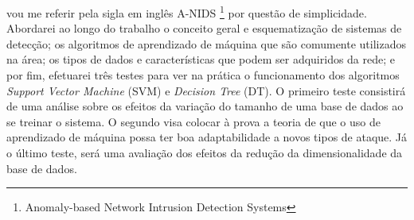  vou me referir pela sigla em inglês A-NIDS \footnote{Anomaly-based Network Intrusion Detection Systems} por questão de
 simplicidade. Abordarei ao longo do trabalho o conceito geral e esquematização de sistemas de detecção; os algoritmos
 de aprendizado de máquina que são comumente utilizados na área; os tipos de dados e características que podem ser
 adquiridos da rede; e por fim, efetuarei três testes para ver na prática o funcionamento dos algoritmos \emph{Support Vector
 Machine} (SVM) e \emph{Decision Tree} (DT). O primeiro teste consistirá de uma análise sobre os efeitos da variação do
 tamanho de uma base de dados ao se treinar o sistema. O segundo visa colocar à prova a teoria de que o uso de aprendizado
 de máquina possa ter boa adaptabilidade a novos tipos de ataque. Já o último teste, será uma avaliação dos efeitos da
 redução da dimensionalidade da base de dados.